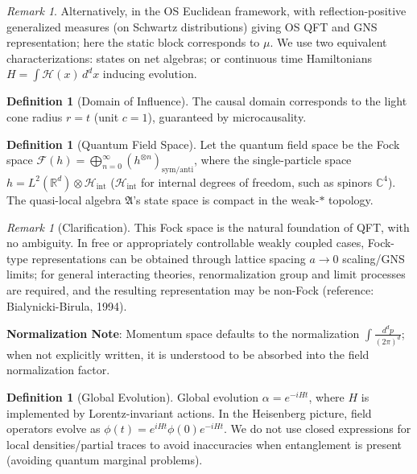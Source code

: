 \documentclass[11pt]{article}
\theoremstyle{definition}
\newtheorem{definition}[theorem]{Definition}
\theoremstyle{remark}
\newtheorem{remark}[theorem]{Remark}
\begin{document}
\begin{remark}\label{rem:2.1}
Alternatively, in the OS Euclidean framework, with reflection-positive generalized measures (on Schwartz distributions) giving OS QFT and GNS representation; here the static block corresponds to \( \mu \). We use two equivalent characterizations: states on net algebras; or continuous time Hamiltonians \( H = \int \mathcal{H}(x) \, d^dx \) inducing evolution.
\end{remark}

\begin{definition}[Domain of Influence]\label{def:domain}
The causal domain corresponds to the light cone radius \( r = t \) (unit \( c=1 \)), guaranteed by microcausality.
\end{definition}

\begin{definition}[Quantum Field Space]\label{def:fieldspace}
Let the quantum field space be the Fock space \( \mathcal{F}(h) = \bigoplus_{n=0}^\infty (h^{\otimes n})_{\mathrm{sym/anti}} \), where the single-particle space \( h = L^2(\mathbb{R}^d) \otimes \mathcal{H}_{\mathrm{int}} \) (\( \mathcal{H}_{\mathrm{int}} \) for internal degrees of freedom, such as spinors \( \mathbb{C}^4 \)). The quasi-local algebra \( \mathfrak{A} \)'s state space is compact in the weak-\( * \) topology.
\end{definition}

\begin{remark}[Clarification]\label{rem:2.2}
This Fock space is the natural foundation of QFT, with no ambiguity. In free or appropriately controllable weakly coupled cases, Fock-type representations can be obtained through lattice spacing \( a\to0 \) scaling/GNS limits; for general interacting theories, renormalization group and limit processes are required, and the resulting representation may be non-Fock (reference: Bialynicki-Birula, 1994).

\textbf{Normalization Note}: Momentum space defaults to the normalization \( \int \!\frac{d^dp}{(2\pi)^d} \); when not explicitly written, it is understood to be absorbed into the field normalization factor.
\end{remark}

\begin{definition}[Global Evolution]\label{def:evolution}
Global evolution \( \alpha = e^{-i H t} \), where \( H \) is implemented by Lorentz-invariant actions. In the Heisenberg picture, field operators evolve as \( \phi(t) = e^{i H t} \phi(0) e^{-i H t} \). We do not use closed expressions for local densities/partial traces to avoid inaccuracies when entanglement is present (avoiding quantum marginal problems).
\end{definition}
\end{document}
